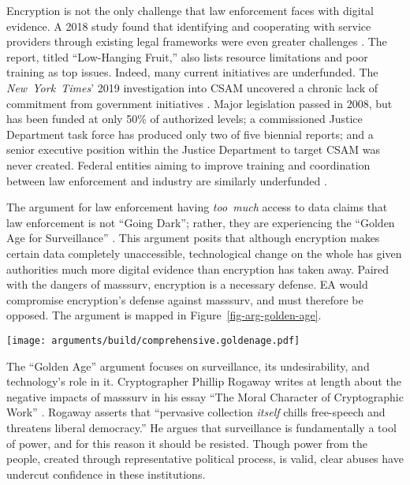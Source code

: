 \documentclass[conference]{IEEEtran}
\def\ii#1{\mbox{\textit{#1}}}
\newcommand{\myfig}[1]{Figure~\ref{#1}}
\begin{document}

Encryption is not the only challenge that law enforcement faces with digital evidence. A 2018 study found that
identifying and cooperating with service providers through existing legal frameworks were even greater challenges
\cite{carter_2018}. The report, titled ``Low-Hanging Fruit,'' also lists resource limitations and poor training as top
issues. Indeed, many current initiatives are underfunded. The \ii{New York Times}' 2019 investigation into \ac{CSAM}
uncovered a chronic lack of commitment from government initiatives \cite{keller_internet_2019}. Major legislation passed
in 2008, but has been funded at only 50\% of authorized levels; a commissioned Justice Department task force has
produced only two of five biennial reports; and a senior executive position within the Justice Department to target
\ac{CSAM} was never created. Federal entities aiming to improve training and coordination between law enforcement and
industry are similarly underfunded \cite{carter_2018}.


The argument for law enforcement having \ii{too much} access to data claims that law enforcement is not ``Going Dark'';
rather, they are experiencing the ``Golden Age for Surveillance'' \cite{swire_encryption_2011}. This argument posits
that although encryption makes certain data completely unaccessible, technological change on the whole has given
authorities much more digital evidence than encryption has taken away. Paired with the dangers of \ac{masssurv},
encryption is a necessary defense. \Ac{EA} would compromise encryption's defense against \ac{masssurv}, and must
therefore be opposed. The argument is mapped in \myfig{fig-arg-golden-age}.

\begin{figure*}[p!]
  \centering
  \texttt{[image: arguments/build/comprehensive.goldenage.pdf]}
  \caption{A ``Golden Age for Surveillance'' Argument Map}
  \label{fig-arg-golden-age}
\end{figure*}

The ``Golden Age'' argument focuses on surveillance, its undesirability, and technology's role in it. Cryptographer
Phillip Rogaway writes at length about the negative impacts of \ac{masssurv} in his essay ``The Moral Character of
Cryptographic Work'' \cite{rogaway_moral_2015}. Rogaway asserts that ``pervasive collection \ii{itself} chills
free-speech and threatens liberal democracy.'' He argues that surveillance is fundamentally a tool of power, and for
this reason it should be resisted. Though power from the people, created through representative political process, is
valid, clear abuses have undercut confidence in these institutions.
\end{document}
